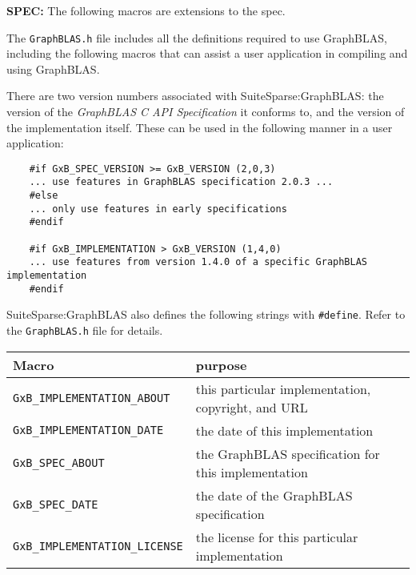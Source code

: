 \documentclass[12pt]{article}
\begin{document}

\begin{spec}
{\bf SPEC:} The following macros are extensions to the spec.
\end{spec}

The \verb'GraphBLAS.h' file includes all the definitions required to use
GraphBLAS, including the following macros that can assist a user application in
compiling and using GraphBLAS.

There are two version numbers associated with SuiteSparse:GraphBLAS:
the version of the {\em GraphBLAS C API Specification} it
conforms to, and the version of the implementation itself.  These can
be used in the following manner in a user application:

{\footnotesize
\begin{verbatim}
    #if GxB_SPEC_VERSION >= GxB_VERSION (2,0,3)
    ... use features in GraphBLAS specification 2.0.3 ...
    #else
    ... only use features in early specifications
    #endif

    #if GxB_IMPLEMENTATION > GxB_VERSION (1,4,0)
    ... use features from version 1.4.0 of a specific GraphBLAS implementation
    #endif \end{verbatim}}


SuiteSparse:GraphBLAS also defines the following strings with \verb'#define'.
Refer to the \verb'GraphBLAS.h' file for details.

\vspace{0.2in}
{\footnotesize
\begin{tabular}{ll}
\hline
Macro                & purpose                                      \\
\hline
\verb'GxB_IMPLEMENTATION_ABOUT'
    & this particular implementation, copyright, and URL \\
\verb'GxB_IMPLEMENTATION_DATE'
    & the date of this implementation \\
\verb'GxB_SPEC_ABOUT'
    & the GraphBLAS specification for this implementation \\
\verb'GxB_SPEC_DATE'
    & the date of the GraphBLAS specification \\
\verb'GxB_IMPLEMENTATION_LICENSE'
    & the license for this particular implementation \\
\hline
\end{tabular}
}
\vspace{0.2in}
\end{document}
